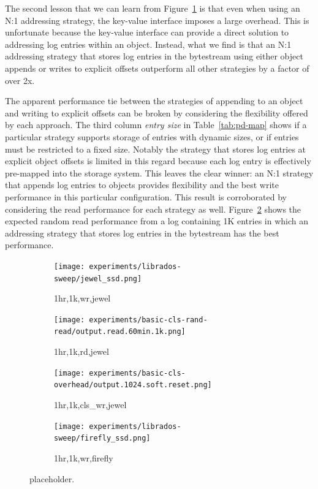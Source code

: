 \documentclass[10pt,twocolumn]{article}
\begin{document}
The second lesson that we can learn from Figure~\ref{fig:vanilla_wr_jewel} is
that even when using an N:1 addressing strategy, the key-value interface
imposes a large overhead. This is unfortunate because the key-value interface
can provide a direct solution to addressing log entries within an object.
Instead, what we find is that an N:1 addressing strategy that stores log
entries in the bytestream using either object appends or writes to explicit
offsets outperform all other strategies by a factor of over 2x.

The apparent performance tie between the strategies of appending to an object
and writing to explicit offsets can be broken by considering the flexibility
offered by each approach. The third column \emph{entry size} in
Table~\ref{tab:pd-map} shows if a particular strategy supports storage of
entries with dynamic sizes, or if entries must be restricted to a fixed size.
Notably the strategy that stores log entries at explicit object offsets is
limited in this regard because each log entry is effectively pre-mapped into
the storage system. This leaves the clear winner: an N:1 strategy that appends
log entries to objects provides flexibility and the best write performance in
this particular configuration.  This result is corroborated by considering the
read performance for each strategy as well. Figure~\ref{fig:vanilla_rd_jewel}
shows the expected random read performance from a log containing 1K entries in
which an addressing strategy that stores log entries in the bytestream has the
best performance.

\begin{figure}[t]
  \centering
  \begin{subfigure}[b]{.47\linewidth}
      \centering
      \texttt{[image: experiments/librados-sweep/jewel\_ssd.png]}
      \caption{1hr,1k,wr,jewel}
      \label{fig:vanilla_wr_jewel}
  \end{subfigure}
  \begin{subfigure}[b]{.47\linewidth}
      \centering
      \texttt{[image: experiments/basic-cls-rand-read/output.read.60min.1k.png]}
      \caption{1hr,1k,rd,jewel}
      \label{fig:vanilla_rd_jewel}
  \end{subfigure}
  \begin{subfigure}[b]{.47\linewidth}
      \centering
      \texttt{[image: experiments/basic-cls-overhead/output.1024.soft.reset.png]}
      \caption{1hr,1k,cls\_wr,jewel}
      \label{fig:cls_wr_jewel}
  \end{subfigure}
  \begin{subfigure}[b]{.47\linewidth}
      \centering
      \texttt{[image: experiments/librados-sweep/firefly\_ssd.png]}
      \caption{1hr,1k,wr,firefly}
      \label{fig:vanilla_wr_firefly}
  \end{subfigure}
  \caption{placeholder.}
\end{figure}
\end{document}
